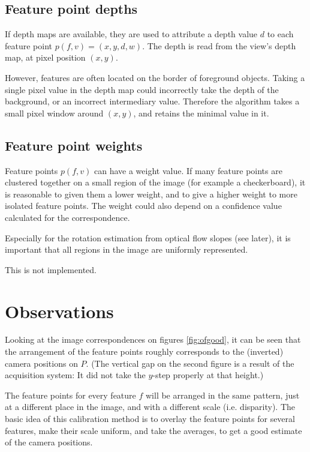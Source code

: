 \documentclass{scrreprt}
\begin{document}
\subsection{Feature point depths}
If depth maps are available, they are used to attribute a depth value $d$ to each feature point $p(f,v) = (x,y,d,w)$. The depth is read from the view's depth map, at pixel position $(x,y)$.

However, features are often located on the border of foreground objects. Taking a single pixel value in the depth map could incorrectly take the depth of the background, or an incorrect intermediary value. Therefore the algorithm takes a small pixel window around $(x,y)$, and retains the minimal value in it.



\subsection{Feature point weights}
Feature points $p(f,v)$ can have a weight value. If many feature points are clustered together on a small region of the image (for example a checkerboard), it is reasonable to given them a lower weight, and to give a higher weight to more isolated feature points. The weight could also depend on a confidence value calculated for the correspondence.

Especially for the rotation estimation from optical flow slopes (see later), it is important that all regions in the image are uniformly represented.

This is not implemented.

\pagebreak
\section{Observations}
Looking at the image correspondences on figures \ref{fig:ofgood}, it can be seen that the arrangement of the feature points roughly corresponds to the (inverted) camera positions on $P$. (The vertical gap on the second figure is a result of the acquisition system: It did not take the $y$-step properly at that height.) 

The feature points for every feature $f$ will be arranged in the same pattern, just at a different place in the image, and with a different scale (i.e. disparity). The basic idea of this calibration method is to overlay the feature points for several features, make their scale uniform, and take the averages, to get a good estimate of the camera positions.
\end{document}
